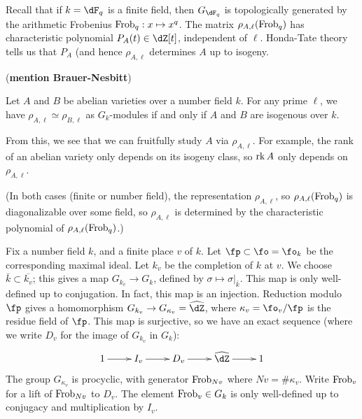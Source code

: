 Recall that if $k=\dF_q$ is a finite field, then $G_{\dF_q}$ is topologically 
generated by the arithmetic Frobenius $\mathrm{Frob}_q:x\mapsto x^q$. The matrix 
$\rho_{A,\ell}(\mathrm{Frob}_q)$ has characteristic polynomial $P_A(t)\in \dZ[t]$, 
independent of $\ell$. Honda-Tate theory tells us that $P_A$ (and hence 
$\rho_{A,\ell}$ determines $A$ up to isogeny. 

(\textbf{mention Brauer-Nesbitt})

\begin{theorem}
Let $A$ and $B$ be abelian varieties over a number field $k$. For any prime 
$\ell$, we have $\rho_{A,\ell}\simeq \rho_{B,\ell}$ as $G_k$-modules if and 
only if $A$ and $B$ are isogenous over $k$. 
\end{theorem}

From this, we see that we can fruitfully study $A$ via $\rho_{A,\ell}$. For 
example, the rank of an abelian variety only depends on its isogeny class, so 
$\operatorname{rk} A$ only depends on $\rho_{A,\ell}$. 

(In both cases (finite or number field), the representation 
$\rho_{A,\ell}$, so $\rho_{A,\ell}(\mathrm{Frob}_q)$ is diagonalizable over some 
field, so $\rho_{A,\ell}$ is determined by the characteristic polynomial of 
$\rho_{A,\ell}(\mathrm{Frob}_q)$.)

Fix a number field $k$, and a finite place $v$ of $k$. Let 
$\fp\subset \fo=\fo_k$ be the corresponding maximal ideal. Let $k_v$ be the 
completion of $k$ at $v$. We choose $\bar k\subset \overline{k_v}$; this gives 
a map $G_{k_v} \to G_k$, defined by $\sigma\mapsto \sigma|_{\bar k}$. This map 
is only well-defined up to conjugation. In fact, this map is an injection. 
Reduction modulo $\fp$ gives a homomorphism 
$G_{k_v} \to G_{\kappa_v}=\widehat\dZ$, where $\kappa_v = \fo_v/\fp$ is the 
residue field of $\fp$. This map is surjective, so we have an exact sequence 
(where we write $D_v$ for the image of $G_{k_v}$ in $G_k$):
\[\xymatrix{
  1 \ar[r] 
    & I_v \ar[r] 
    & D_v \ar[r] 
    & \widehat\dZ \ar[r] 
    & 1
}\]
The group $G_{\kappa_v}$ is procyclic, with generator 
$\mathrm{Frob}_{N v}$ where $N v = \# \kappa_v$. Write $\mathrm{Frob}_v$ for a lift of 
$\mathrm{Frob}_{N v}$ to $D_v$. The element $\mathrm{Frob}_v\in G_k$ is only well-defined up to 
conjugacy and multiplication by $I_v$. 

